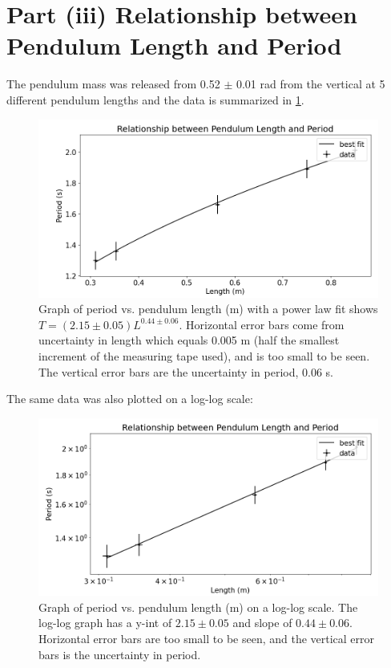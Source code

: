 \documentclass[notitlepage, twocolumn, 12pt]{article}
\begin{document}
    \section*{Part (iii) Relationship between Pendulum Length and Period}
    The pendulum mass was released from 0.52 $\pm$ 0.01 rad from the vertical at 5 different pendulum lengths and the data is summarized in \cref{fig:pendulumLengthVsPeriod}.
    \begin{figure}[H]
        \includegraphics[width=\linewidth]{lengthvsperiodreal.png}
        \caption{Graph of period vs. pendulum length (m) with a power law fit shows $T = (2.15 \pm 0.05)L^{0.44 \pm 0.06}$. Horizontal error bars come from uncertainty in length which equals 0.005 m (half the smallest increment of the measuring tape used), and is too small to be seen. The vertical error bars are the uncertainty in period, 0.06 s. }
        \label{fig:pendulumLengthVsPeriod}
    \end{figure} 
    The same data was also plotted on a log-log scale:
    \begin{figure}[H]
        \includegraphics[width=\linewidth]{loglong-lengthvsperiodv2.png}
        \caption{Graph of period vs. pendulum length (m) on a log-log scale. The log-log graph has a y-int of $2.15 \pm 0.05$ and slope of $0.44 \pm 0.06$. Horizontal error bars are too small to be seen, and the vertical error bars is the uncertainty in period. }
        \label{fig:loglog-pendulumLengthVsPeriod}
    \end{figure} 
\end{document}
